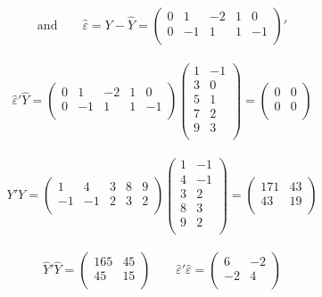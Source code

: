 \documentclass[11pt,a4paper]{article}
\theoremstyle{definition}
\begin{document}
 
$$\text{and}\qquad  \widehat{\varepsilon} = Y - \widehat{Y}=
\begin{pmatrix}
0 & 1 & -2 & 1 & 0\\
0 & -1 & 1 & 1 & -1\\
\end{pmatrix}'
$$\\


$$\widehat{\varepsilon}'\widehat{Y}=
\begin{pmatrix}
0 & 1 & -2 & 1 & 0\\
0 & -1 & 1 & 1 & -1\\
\end{pmatrix}
\begin{pmatrix}
1 & -1\\
3 & 0\\
5 & 1\\
7 & 2\\
9 & 3\\
\end{pmatrix}
=
\begin{pmatrix}
0 & 0\\
0 & 0\\
\end{pmatrix}
$$\\


$$Y'Y =
\begin{pmatrix}
1 & 4 & 3 & 8 & 9\\
-1 & -1 & 2 & 3 & 2\\
\end{pmatrix}
\begin{pmatrix}
1 & -1\\
4 & -1\\
3 & 2\\
8 & 3\\
9 & 2\\
\end{pmatrix}
=
\begin{pmatrix}
171 & 43\\
43 & 19\\
\end{pmatrix}
$$\\



$$\widehat{Y}'\widehat{Y}=
\begin{pmatrix}
165 & 45\\
45 & 15\\
\end{pmatrix}
\qquad \widehat{\varepsilon}'\widehat{\varepsilon}=
\begin{pmatrix}
6 & -2\\
-2 & 4\\
\end{pmatrix}
$$\\
\end{document}
